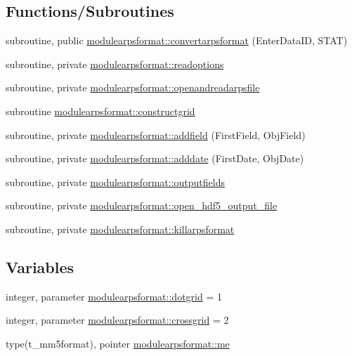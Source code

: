 \subsection*{Functions/\+Subroutines}
\begin{DoxyCompactItemize}
\item 
subroutine, public \mbox{\hyperlink{namespacemodulearpsformat_a996acecfde01fb49e6408da52cb50d12}{modulearpsformat\+::convertarpsformat}} (Enter\+Data\+ID, S\+T\+AT)
\item 
subroutine, private \mbox{\hyperlink{namespacemodulearpsformat_a51cf1784c51ab9940cffc068600d53ac}{modulearpsformat\+::readoptions}}
\item 
subroutine, private \mbox{\hyperlink{namespacemodulearpsformat_a70ee83442772ea85df79da65ec4ea262}{modulearpsformat\+::openandreadarpsfile}}
\item 
subroutine \mbox{\hyperlink{namespacemodulearpsformat_a420eb740016c6ba55f897dbff1ef74e5}{modulearpsformat\+::constructgrid}}
\item 
subroutine, private \mbox{\hyperlink{namespacemodulearpsformat_a32649b9f39dfaa2b5396d488243a3905}{modulearpsformat\+::addfield}} (First\+Field, Obj\+Field)
\item 
subroutine, private \mbox{\hyperlink{namespacemodulearpsformat_a3e7adeca2b8b386d9c8d59f32a8c189f}{modulearpsformat\+::adddate}} (First\+Date, Obj\+Date)
\item 
subroutine, private \mbox{\hyperlink{namespacemodulearpsformat_a3feae8181a739c2898e331dd969e3c67}{modulearpsformat\+::outputfields}}
\item 
subroutine, private \mbox{\hyperlink{namespacemodulearpsformat_a9c9927c6fb171da5b0bfc4cd38595627}{modulearpsformat\+::open\+\_\+hdf5\+\_\+output\+\_\+file}}
\item 
subroutine, private \mbox{\hyperlink{namespacemodulearpsformat_a3fbe9c856c732d4e5f2315c2ae61e3d3}{modulearpsformat\+::killarpsformat}}
\end{DoxyCompactItemize}
\subsection*{Variables}
\begin{DoxyCompactItemize}
\item 
integer, parameter \mbox{\hyperlink{namespacemodulearpsformat_adad659745a61e1b477c5b8218c0a518b}{modulearpsformat\+::dotgrid}} = 1
\item 
integer, parameter \mbox{\hyperlink{namespacemodulearpsformat_a481f4077f9a97ca259535ae7940a069d}{modulearpsformat\+::crossgrid}} = 2
\item 
type(t\+\_\+mm5format), pointer \mbox{\hyperlink{namespacemodulearpsformat_aa48b8d20bd8a9748703bc70c33e5bce9}{modulearpsformat\+::me}}
\end{DoxyCompactItemize}
